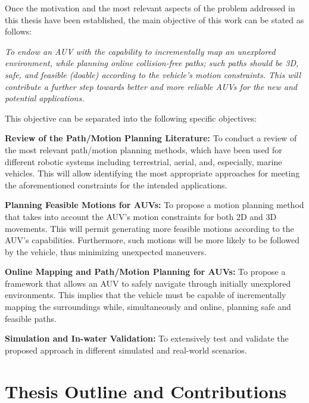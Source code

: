 Once the motivation and the most relevant aspects of the problem addressed in
this thesis have been established, the main objective of this work can be stated
as follows:

\bigskip

\noindent \textit{To endow an \acf{AUV} with the capability to incrementally map
an unexplored environment, while planning online collision-free paths; such paths
should be \acf{3D}, safe, and feasible (doable) according to the vehicle's
motion constraints. This will contribute a further step towards better and more
reliable \acp{AUV} for the new and potential applications.}

\bigskip

This objective can be separated into the following specific
objectives:

\bigskip

\noindent\textbf{Review of the Path/Motion Planning Literature:} To conduct a
review of the most relevant path/motion planning methods, which have been used
for different robotic systems including terrestrial, aerial, and, especially,
marine vehicles. This will allow identifying the most appropriate approaches for
meeting the aforementioned constraints for the intended applications.

\bigskip

\noindent\textbf{Planning Feasible Motions for AUVs:} To propose a motion
planning method that takes into account the \ac{AUV}'s motion constraints for
both 2D and 3D movements. This will permit generating more feasible motions
according to the \ac{AUV}'s capabilities. Furthermore, such motions will be more
likely to be followed by the vehicle, thus minimizing unexpected maneuvers.

\bigskip

\noindent\textbf{Online Mapping and Path/Motion Planning for AUVs:} To propose a
framework that allows an \ac{AUV} to safely navigate through initially
unexplored environments. This implies that the vehicle must be capable of
incrementally mapping the surroundings while, simultaneously and online,
planning safe and feasible paths.

\bigskip

\noindent\textbf{Simulation and In-water Validation:} To extensively test and
validate the proposed approach in different simulated and real-world scenarios.

\section{Thesis Outline and Contributions}

